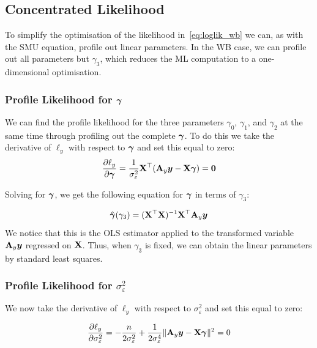 \subsection{Concentrated Likelihood}

To simplify the optimisation of the likelihood in~\eqref{eq:loglik_wb} we can, as with the SMU equation, profile out linear parameters. In the WB case, we can profile out all parameters but $\gamma_3$, which reduces the ML computation to a one-dimensional optimisation.

\subsubsection{Profile Likelihood for $\bm{\gamma}$}

We can find the profile likelihood for the three parameters $\gamma_0$, $\gamma_1$, and $\gamma_2$ at the same time through profiling out the complete $\bm{\gamma}$. To do this we take the derivative of $\ell_y$ with respect to $\bm{\gamma}$ and set this equal to zero:
\begin{equation}
    \frac{\partial \ell_y}{\partial \bm{\gamma}} = \frac{1}{\sigma_\varepsilon^2}\mathbf{X}^\top(\mathbf{A}_y\bm{y} - \mathbf{X}\bm{\gamma}) = \bm{0}
\end{equation}

Solving for $\bm{\gamma}$, we get the following equation for $\bm{\gamma}$ in terms of $\gamma_3$:

\begin{equation}
\label{eq:gamma_profile}
    \hat{\bm{\gamma}}(\gamma_3) = (\mathbf{X}^\top\mathbf{X})^{-1}\mathbf{X}^\top\mathbf{A}_y\bm{y}
\end{equation}
We notice that this is the OLS estimator applied to the transformed variable $\mathbf{A}_y\bm{y}$ regressed on $\mathbf{X}$. Thus, when $\gamma_3$ is fixed, we can obtain the linear parameters by standard least squares.

\subsubsection{Profile Likelihood for $\sigma_\varepsilon^2$}

We now take the derivative of $\ell_y$ with respect to $\sigma_\varepsilon^2$ and set this equal to zero:

\begin{equation}
    \frac{\partial \ell_y}{\partial \sigma_\varepsilon^2} =
    -\frac{n}{2\sigma_\varepsilon^2} + \frac{1}{2\sigma_\varepsilon^4}\|\mathbf{A}_y\bm{y} - \mathbf{X}\bm{\gamma}\|^2 = 0
\end{equation}

